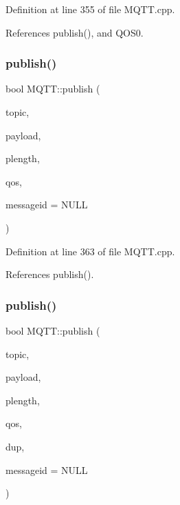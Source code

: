 Definition at line 355 of file M\+Q\+T\+T.\+cpp.



References publish(), and Q\+O\+S0.

\mbox{\label{class_m_q_t_t_ae9ea303a55434b8a6bba3147938aa9a9}} 
\subsubsection{\texorpdfstring{publish()}{publish()}\hspace{0.1cm}{\footnotesize\ttfamily [6/10]}}
{\footnotesize\ttfamily bool M\+Q\+T\+T\+::publish (\begin{DoxyParamCaption}\item[{const char $\ast$}]{topic,  }\item[{const uint8\+\_\+t $\ast$}]{payload,  }\item[{unsigned int}]{plength,  }\item[{\hyperlink{class_m_q_t_t_aff501e08e20ebf26b3272fcc0e7215ff}{E\+M\+Q\+T\+T\+\_\+\+Q\+OS}}]{qos,  }\item[{uint16\+\_\+t $\ast$}]{messageid = {\ttfamily NULL} }\end{DoxyParamCaption})}



Definition at line 363 of file M\+Q\+T\+T.\+cpp.



References publish().

\mbox{\label{class_m_q_t_t_a5e7738081e77b6c381f71737e8841869}} 
\subsubsection{\texorpdfstring{publish()}{publish()}\hspace{0.1cm}{\footnotesize\ttfamily [7/10]}}
{\footnotesize\ttfamily bool M\+Q\+T\+T\+::publish (\begin{DoxyParamCaption}\item[{const char $\ast$}]{topic,  }\item[{const uint8\+\_\+t $\ast$}]{payload,  }\item[{unsigned int}]{plength,  }\item[{\hyperlink{class_m_q_t_t_aff501e08e20ebf26b3272fcc0e7215ff}{E\+M\+Q\+T\+T\+\_\+\+Q\+OS}}]{qos,  }\item[{bool}]{dup,  }\item[{uint16\+\_\+t $\ast$}]{messageid = {\ttfamily NULL} }\end{DoxyParamCaption})}



